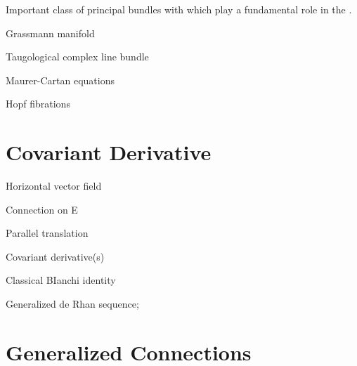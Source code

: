 Important class of principal bundles with  which play a fundamental role in the .

Grassmann manifold

Taugological complex line bundle

Maurer-Cartan equations

Hopf fibrations

\section{Covariant Derivative}

Horizontal vector field

Connection on E

Parallel translation

Covariant derivative(s)

Classical BIanchi identity

Generalized de Rhan sequence; 

\section{Generalized Connections}